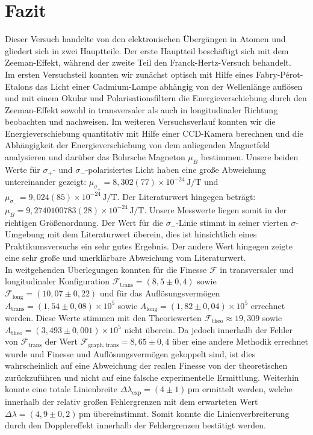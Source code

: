 \chapter{Fazit}

Dieser Versuch handelte von den elektronischen Übergängen in Atomen und gliedert sich in zwei Hauptteile. Der erste Hauptteil beschäftigt sich mit dem Zeeman-Effekt, während der zweite Teil den Franck-Hertz-Versuch behandelt.
\vspace{0.3cm}\\
Im ersten Versuchsteil konnten wir zunächst optisch mit Hilfe eines Fabry-Pérot-Etalons das Licht einer Cadmium-Lampe abhängig von der Wellenlänge auflösen und mit einem Okular und Polarisationsfiltern die Energieverschiebung durch den Zeeman-Effekt sowohl in transversaler als auch in longitudinaler Richtung beobachten und nachweisen. Im weiteren Versuchsverlauf konnten wir die Energieverschiebung quantitativ mit Hilfe einer CCD-Kamera berechnen und die Abhängigkeit der Energieverschiebung von dem anliegenden Magnetfeld analysieren und darüber das Bohrsche Magneton $\mu_B$ bestimmen. Unsere beiden Werte für $\sigma_+$- und $\sigma_-$-polarisiertes Licht haben eine große Abweichung untereinander gezeigt: $\mu_{\sigma_+} = 8{,}302(77)\times10^{-24}\,\mathrm{J/T}$ und $\mu_{\sigma_-} = 9{,}024(85)\times10^{-24}\,\mathrm{J/T}$. Der Literaturwert hingegen beträgt: $\mu_B = 9{,}2740100783(28)\times10^{-24}\,\mathrm{J/T}$. Unsere Messwerte liegen somit in der richtigen Größenordnung. Der Wert für die $\sigma_-$-Linie stimmt in seiner vierten $\sigma$-Umgebung mit dem Literaturwert überein, dies ist hinsichtlich eines Praktikumsversuchs ein sehr gutes Ergebnis. Der andere Wert hingegen zeigte eine sehr große und unerklärbare Abweichung vom Literaturwert.
\vspace{0.3cm}\\
In weitgehenden Überlegungen konnten für die Finesse $\mathcal{F}$ in transversaler und longitudinaler Konfiguration $\mathcal{F}_{\mathrm{trans}} = (8{,}5 \pm 0{,}4)$ sowie $\mathcal{F}_{\mathrm{long}} = (10{,}07 \pm 0{,}22)$ und für das Auflösungsvermögen $A_{\mathrm{trans}} = (1{,}54 \pm 0{,}08)\times10^5$ sowie $A_{\mathrm{long}} = (1{,}82 \pm 0{,}04)\times10^5$ errechnet werden. Diese Werte stimmen mit den Theorie­werten $\mathcal{F}_{\mathrm{theo}} \approx 19{,}309$ sowie $A_{\mathrm{theo}} = (3{,}493 \pm 0{,}001)\times10^5$ nicht überein. Da jedoch innerhalb der Fehler von $\mathcal{F}_{\mathrm{trans}}$ der Wert $\mathcal{F}_{\mathrm{graph,trans}} = 8{,}65 \pm 0{,}4$ über eine andere Methodik errechnet wurde und Finesse und Auflösungsvermögen gekoppelt sind, ist dies wahrscheinlich auf eine Abweichung der realen Finesse von der theoretischen zurückzuführen und nicht auf eine falsche experimentelle Ermittlung. Weiterhin konnte eine totale Linienbreite $\Delta\lambda_{\mathrm{exp}} = (4 \pm 1)\,\mathrm{pm}$ ermittelt werden, welche innerhalb der relativ großen Fehlergrenzen mit dem erwarteten Wert $\Delta\lambda = (4{,}9 \pm 0{,}2)\,\mathrm{pm}$ übereinstimmt. Somit konnte die Linienverbreiterung durch den Dopplereffekt innerhalb der Fehlergrenzen bestätigt werden.
